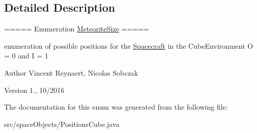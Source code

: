 \subsection{Detailed Description}
===== Enumeration \hyperlink{enumspace_objects_1_1_meteorite_size}{Meteorite\+Size} =====

enumeration of possible positions for the \hyperlink{classspace_objects_1_1_spacecraft}{Spacecraft} in the Cube\+Environment O = 0 and I = 1

\begin{DoxyAuthor}{Author}
Vincent Reynaert, Nicolas Sobczak 
\end{DoxyAuthor}
\begin{DoxyVersion}{Version}
1., 10/2016 
\end{DoxyVersion}


The documentation for this enum was generated from the following file\+:\begin{DoxyCompactItemize}
\item 
src/space\+Objects/Positions\+Cube.\+java\end{DoxyCompactItemize}
